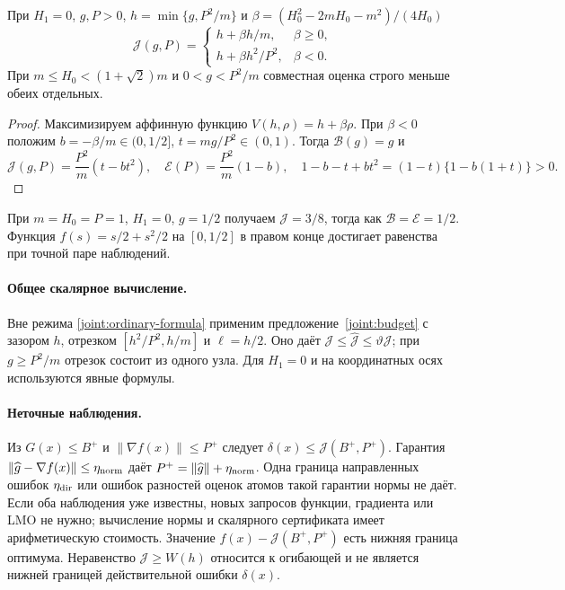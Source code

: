\begin{corollary}
\label{joint:constant}
При $H_1=0$, $g,P>0$, $h=\min\{g,P^2/m\}$ и
$\beta=(H_0^2-2mH_0-m^2)/(4H_0)$
\begin{equation}\label{joint:constant-formula}
 \mathcal J(g,P)=
 \begin{cases}
 h+\beta h/m,&\beta\ge0,\\
 h+\beta h^2/P^2,&\beta<0.
 \end{cases}
\end{equation}
При $m\le H_0<(1+\sqrt2)m$ и $0<g<P^2/m$ совместная оценка
строго меньше обеих отдельных.
\end{corollary}
\begin{proof}
Максимизируем аффинную функцию $V(h,\rho)=h+\beta\rho$.
При $\beta<0$ положим $b=-\beta/m\in(0,1/2]$,
$t=mg/P^2\in(0,1)$. Тогда $\mathcal B(g)=g$ и
\[
 \mathcal J(g,P)=\frac{P^2}{m}(t-bt^2),\quad
 \mathcal E(P)=\frac{P^2}{m}(1-b),\quad
 1-b-t+bt^2=(1-t)\{1-b(1+t)\}>0.
\]
\end{proof}
При $m=H_0=P=1$, $H_1=0$, $g=1/2$ получаем
$\mathcal J=3/8$, тогда как $\mathcal B=\mathcal E=1/2$.
Функция $f(s)=s/2+s^2/2$ на $[0,1/2]$ в правом конце
достигает равенства при точной паре наблюдений.

\paragraph{Общее скалярное вычисление.}
Вне режима \eqref{joint:ordinary-formula} применим
предложение~\ref{joint:budget} с зазором $h$, отрезком
$[h^2/P^2,h/m]$ и $\ell=h/2$.
Оно даёт $\mathcal J\le\widehat{\mathcal J}\le\vartheta\mathcal J$;
при $g\ge P^2/m$ отрезок состоит из одного узла.
Для $H_1=0$ и на координатных осях используются явные формулы.

\paragraph{Неточные наблюдения.}
Из $G(x)\le B^+$ и $\|\nabla f(x)\|\le P^+$ следует
$\delta(x)\le\mathcal J(B^+,P^+)$.
Гарантия $\|\widehat g-\nabla f(x)\|\le\eta_{\rm norm}$ даёт
$P^+=\|\widehat g\|+\eta_{\rm norm}$.
Одна граница направленных ошибок $\eta_{\rm dir}$ или ошибок
разностей оценок атомов такой гарантии нормы не даёт.
Если оба наблюдения уже известны, новых запросов функции,
градиента или LMO не нужно; вычисление нормы и скалярного
сертификата имеет арифметическую стоимость.
Значение $f(x)-\mathcal J(B^+,P^+)$ есть нижняя граница оптимума.
Неравенство $\mathcal J\ge W(h)$ относится к огибающей и не
является нижней границей действительной ошибки $\delta(x)$.
